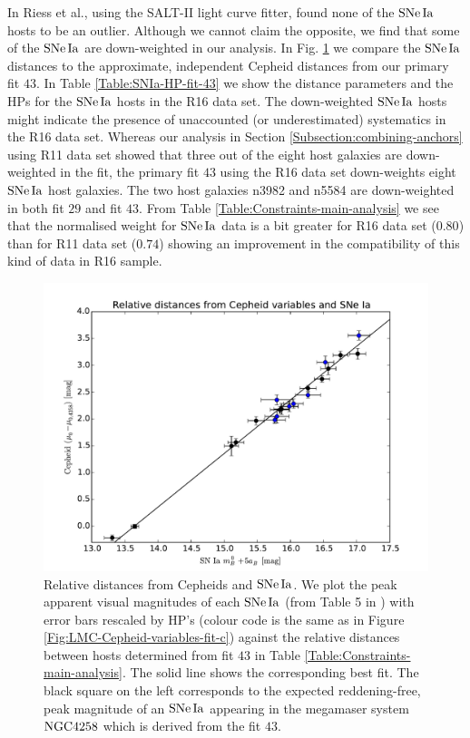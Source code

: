 In \cite{Riess:2016jrr} Riess et al., using the SALT-II light curve fitter, found none of the $\mathrm{SNe\,Ia}$ hosts to be an outlier. Although we cannot claim the opposite, we find that some of the $\mathrm{SNe\,Ia}$ are down-weighted in our analysis. In Fig. \ref{Fig:comparison-distances-R16} we compare the $\mathrm{SNe\,Ia}$ distances to the approximate, independent Cepheid distances from our primary fit $43$. In Table \ref{Table:SNIa-HP-fit-43} we show the distance parameters and the HPs for the $\mathrm{SNe\,Ia}$ hosts in the R16 data set. The down-weighted $\mathrm{SNe\,Ia}$ hosts might indicate the presence of unaccounted (or underestimated) systematics in the R16 data set. Whereas our analysis in Section \ref{Subsection:combining-anchors} using R11 data set showed that three out of the eight host galaxies are down-weighted in the fit, the primary fit $43$ using the R16 data set down-weights eight $\mathrm{SNe\,Ia}$ host galaxies. The two host galaxies n3982 and n5584 are down-weighted in both fit $29$ and fit $43$. From Table \ref{Table:Constraints-main-analysis} we see that the normalised weight for $\mathrm{SNe\,Ia}$ data is a bit greater for R16 data set ($0.80$) than for R11 data set ($0.74$)  showing an improvement in the compatibility of this kind of data in R16 sample.

\begin{figure}[hbtp]
\centering
\includegraphics[scale=0.75]{figures/chapter-h0/effective_HP_SNIa_R16.pdf}
\caption{Relative distances from Cepheids and $\mathrm{SNe\,Ia}$. We plot the peak apparent visual magnitudes of each $\mathrm{SNe\,Ia}$ (from Table 5 in \cite{Riess:2016jrr}) with error bars rescaled by HP's (colour code is the same as in Figure \ref{Fig:LMC-Cepheid-variables-fit-c}) against the relative distances between hosts determined from fit $43$ in Table \ref{Table:Constraints-main-analysis}. The solid line shows the corresponding best fit. The black square on the left corresponds to the expected reddening-free, peak magnitude of an $\mathrm{SNe\,Ia}$ appearing in the megamaser system $\mathrm{NGC4258}$ which is derived from the fit $43$.}
\label{Fig:comparison-distances-R16}
\end{figure}

